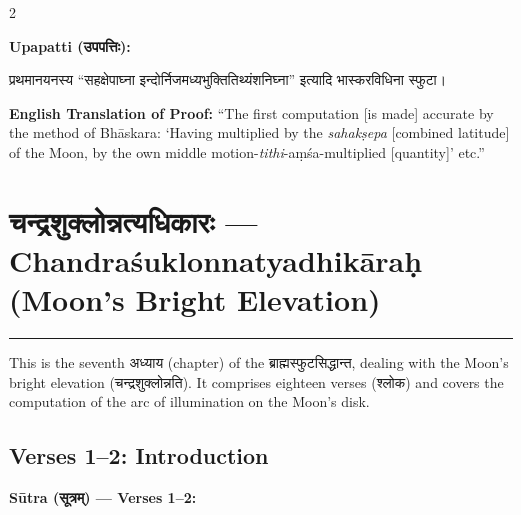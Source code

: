\documentclass[11pt,a4paper]{article}
\newcommand{\dev}[1]{{\devanagarifont #1}}
\newenvironment{sanskritverse}{%
  \begin{center}\begin{minipage}{0.95\textwidth}
  \setlength{\leftskip}{1em}
  \setlength{\rightskip}{1em}
  \dev
}{\end{minipage}\end{center}}
\begin{document}
\vspace{0.5em}

\begin{paracol}{2}

\noindent\textbf{Upapatti (\dev{उपपत्तिः}):}
\begin{sanskritverse}
प्रथमानयनस्य ``सहक्षेपाघ्ना इन्दोर्निजमध्यभुक्तितिथ्यंशनिघ्ना'' इत्यादि
भास्करविधिना स्फुटा।
\end{sanskritverse}

\switchcolumn

\textbf{English Translation of Proof:} ``The first computation [is made] accurate by the method of Bhāskara: `Having multiplied by the \textit{sahakṣepa} [combined latitude] of the Moon, by the own middle motion-\textit{tithi}-aṃśa-multiplied [quantity]' etc.''

\end{paracol}

\newpage


\section{\texorpdfstring{{\devanagarifont चन्द्रशुक्लोन्नत्यधिकारः} — Chandraśuklonnatyadhikāraḥ (Moon's Bright Elevation)}{Chandraśuklonnatyadhikāraḥ (Moon's Bright Elevation)}}
\label{sec:chandra-shuklonnati}

\begin{center}
\textcolor{rulecolor}{\rule{0.8\textwidth}{0.5pt}}
\end{center}

This is the seventh \dev{अध्याय} (chapter) of the \dev{ब्राह्मस्फुटसिद्धान्त}, dealing with the Moon's bright elevation (\dev{चन्द्रशुक्लोन्नति}). It comprises eighteen verses (\dev{श्लोक}) and covers the computation of the arc of illumination on the Moon's disk.

\subsection{Verses 1--2: Introduction}

\vspace{0.5em}
\noindent\textbf{Sūtra (\dev{सूत्रम्}) — Verses 1--2:}
\end{document}
